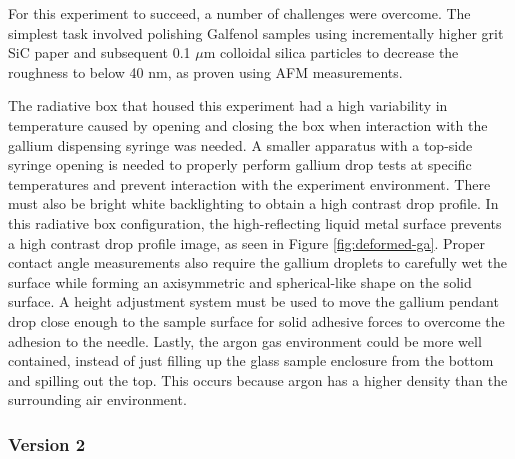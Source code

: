 For this experiment to succeed, a number of challenges were overcome. The simplest task involved polishing Galfenol samples using incrementally higher grit SiC paper and subsequent 0.1 $\mu$m colloidal silica particles to decrease the roughness to below 40 nm, as proven using AFM measurements. %

The radiative box that housed this experiment had a high variability in temperature caused by opening and closing the box when interaction with the gallium dispensing syringe was needed. A smaller apparatus with a top-side syringe opening is needed to properly perform gallium drop tests at specific temperatures and prevent interaction with the experiment environment. There must also be bright white backlighting to obtain a high contrast drop profile. In this radiative box configuration, the high-reflecting liquid metal surface prevents a high contrast drop profile image, as seen in Figure \ref{fig:deformed-ga}. Proper contact angle measurements also require the gallium droplets to carefully wet the surface while forming an axisymmetric and spherical-like shape on the solid surface. A height adjustment system must be used to move the gallium pendant drop close enough to the sample surface for solid adhesive forces to overcome the adhesion to the needle. Lastly, the argon gas environment could be more well contained, instead of just filling up the glass sample enclosure from the bottom and spilling out the top. This occurs because argon has a higher density than the surrounding air environment. 

\subsubsection{Version 2}


